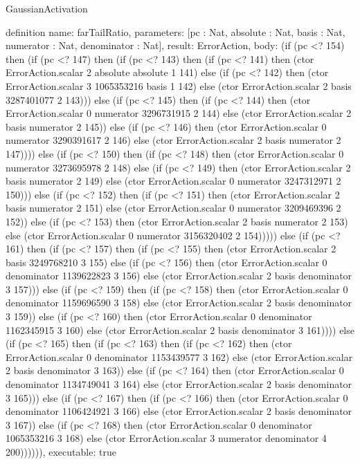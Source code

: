 \begin{lexlean}{GaussianActivation}
\begin{semanticmodule}
definition{
  name: farTailRatio,
  parameters: [pc : Nat, absolute : Nat, basis : Nat, numerator : Nat, denominator : Nat],
  result: ErrorAction,
  body: (if (pc <? 154) then (if (pc <? 147) then (if (pc <? 143) then (if (pc <? 141) then (ctor ErrorAction.scalar 2 absolute absolute 1 141) else (if (pc <? 142) then (ctor ErrorAction.scalar 3 1065353216 basis 1 142) else (ctor ErrorAction.scalar 2 basis 3287401077 2 143))) else (if (pc <? 145) then (if (pc <? 144) then (ctor ErrorAction.scalar 0 numerator 3296731915 2 144) else (ctor ErrorAction.scalar 2 basis numerator 2 145)) else (if (pc <? 146) then (ctor ErrorAction.scalar 0 numerator 3290391617 2 146) else (ctor ErrorAction.scalar 2 basis numerator 2 147)))) else (if (pc <? 150) then (if (pc <? 148) then (ctor ErrorAction.scalar 0 numerator 3273695978 2 148) else (if (pc <? 149) then (ctor ErrorAction.scalar 2 basis numerator 2 149) else (ctor ErrorAction.scalar 0 numerator 3247312971 2 150))) else (if (pc <? 152) then (if (pc <? 151) then (ctor ErrorAction.scalar 2 basis numerator 2 151) else (ctor ErrorAction.scalar 0 numerator 3209469396 2 152)) else (if (pc <? 153) then (ctor ErrorAction.scalar 2 basis numerator 2 153) else (ctor ErrorAction.scalar 0 numerator 3156320402 2 154))))) else (if (pc <? 161) then (if (pc <? 157) then (if (pc <? 155) then (ctor ErrorAction.scalar 2 basis 3249768210 3 155) else (if (pc <? 156) then (ctor ErrorAction.scalar 0 denominator 1139622823 3 156) else (ctor ErrorAction.scalar 2 basis denominator 3 157))) else (if (pc <? 159) then (if (pc <? 158) then (ctor ErrorAction.scalar 0 denominator 1159696590 3 158) else (ctor ErrorAction.scalar 2 basis denominator 3 159)) else (if (pc <? 160) then (ctor ErrorAction.scalar 0 denominator 1162345915 3 160) else (ctor ErrorAction.scalar 2 basis denominator 3 161)))) else (if (pc <? 165) then (if (pc <? 163) then (if (pc <? 162) then (ctor ErrorAction.scalar 0 denominator 1153439577 3 162) else (ctor ErrorAction.scalar 2 basis denominator 3 163)) else (if (pc <? 164) then (ctor ErrorAction.scalar 0 denominator 1134749041 3 164) else (ctor ErrorAction.scalar 2 basis denominator 3 165))) else (if (pc <? 167) then (if (pc <? 166) then (ctor ErrorAction.scalar 0 denominator 1106424921 3 166) else (ctor ErrorAction.scalar 2 basis denominator 3 167)) else (if (pc <? 168) then (ctor ErrorAction.scalar 0 denominator 1065353216 3 168) else (ctor ErrorAction.scalar 3 numerator denominator 4 200)))))),
  executable: true
}


\end{semanticmodule}
\end{lexlean}
